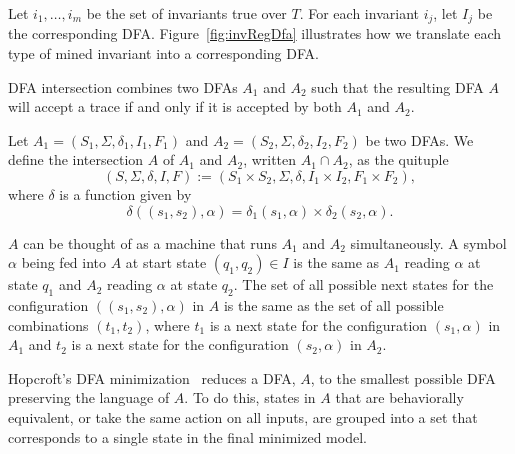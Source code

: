 \begin{definition}
Let $i_1, \ldots, i_m$ be 
the set of invariants true over $T$.
For each invariant $i_j$, let $I_j$ be the corresponding DFA. 
Figure~\ref{fig:invRegDfa} illustrates how we translate each type of mined invariant
into a corresponding DFA. 
\end{definition}

\begin{definition}
DFA intersection combines two DFAs $A_1$ and $A_2$ such that the resulting DFA $A$ will
accept a trace if and only if it is accepted by both $A_1$ and $A_2$.

Let $A_1=(S_1,\Sigma,\delta_1,I_1,F_1)$ and
$A_2=(S_2,\Sigma,\delta_2,I_2,F_2)$ be two DFAs.
We define the intersection $A$ of $A_1$ and $A_2$, written $A_1\cap A_2$, as the quituple
$$(S,\Sigma,\delta,I,F):=(S_1\times S_2,\Sigma,\delta, I_1\times I_2, F_1\times F_2),$$
where $\delta$ is a function
given by $$\delta((s_1,s_2),\alpha)=\delta_1(s_1,\alpha)\times \delta_2(s_2,\alpha).$$

$A$ can be thought of as a machine that runs
$A_1$ and $A_2$ simultaneously. A symbol $\alpha$ being fed into $A$ at start state $(q_1,q_2)\in I$
is the same as $A_1$ reading $\alpha$ at state $q_1$ and $A_2$ reading $\alpha$ at state $q_2$. The
set of all possible next states for the configuration $((s_1,s_2),\alpha)$ in $A$ is the same as the
set of all possible combinations $(t_1,t_2)$, where $t_1$ is a next state for the configuration
$(s_1,\alpha)$ in $A_1$ and $t_2$ is a next state for the configuration $(s_2,\alpha)$ in $A_2$.
\end{definition}

\begin{definition}
Hopcroft's DFA minimization~\cite{hopcroft_minimization_tr1971} 
reduces a DFA, $A$, to the smallest possible DFA
preserving the language of $A$.
To do this, states in $A$ that are
behaviorally equivalent, or take the same action on all inputs, are grouped into
a set that corresponds to a single state in the final minimized model.

\end{definition}


